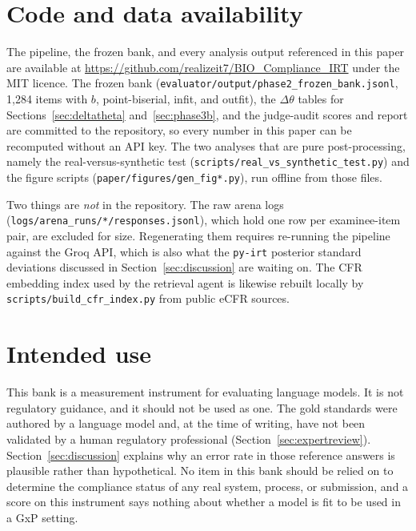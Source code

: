\section*{Code and data availability}

\begingroup
\sloppy

The pipeline, the frozen bank, and every analysis output referenced in
this paper are available at
\url{https://github.com/realizeit7/BIO_Compliance_IRT} under the MIT
licence. The frozen bank
(\texttt{evaluator/output/phase2\_frozen\_bank.jsonl}, 1{,}284 items with
$b$, point-biserial, infit, and outfit), the $\Delta\theta$ tables for
Sections~\ref{sec:deltatheta} and~\ref{sec:phase3b}, and the judge-audit
scores and report are committed to the repository, so every number in
this paper can be recomputed without an API key. The two analyses that
are pure post-processing, namely the real-versus-synthetic test
(\texttt{scripts/real\_vs\_synthetic\_test.py}) and the figure scripts
(\texttt{paper/figures/gen\_fig*.py}), run offline from those files.

Two things are \emph{not} in the repository. The raw arena logs
(\texttt{logs/arena\_runs/*/responses.jsonl}), which hold one row per
examinee-item pair, are excluded for size. Regenerating them requires
re-running the pipeline against the Groq API, which is also what the
\texttt{py-irt} posterior standard deviations discussed in
Section~\ref{sec:discussion} are waiting on. The CFR embedding index used
by the retrieval agent is likewise rebuilt locally by
\texttt{scripts/build\_cfr\_index.py} from public eCFR sources.

\endgroup

\section*{Intended use}

This bank is a measurement instrument for evaluating language models. It
is not regulatory guidance, and it should not be used as one. The gold
standards were authored by a language model and, at the time of writing,
have not been validated by a human regulatory professional
(Section~\ref{sec:expertreview}). Section~\ref{sec:discussion} explains
why an error rate in those reference answers is plausible rather than
hypothetical. No item in this bank should be relied on to determine the
compliance status of any real system, process, or submission, and a score
on this instrument says nothing about whether a model is fit to be used
in a GxP setting.
